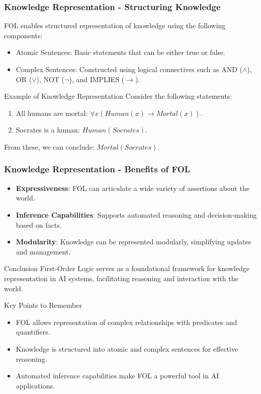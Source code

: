 \documentclass[aspectratio=169]{beamer}
\begin{document}
\begin{frame}[fragile]
    \frametitle{Knowledge Representation - Structuring Knowledge}
    FOL enables structured representation of knowledge using the following components:
    \begin{itemize}
        \item Atomic Sentences: Basic statements that can be either true or false.
        \item Complex Sentences: Constructed using logical connectives such as AND ($\land$), OR ($\lor$), NOT ($\neg$), and IMPLIES ($\to$).
    \end{itemize}

    \begin{block}{Example of Knowledge Representation}
        Consider the following statements:
        \begin{enumerate}
            \item All humans are mortal: $\forall x (Human(x) \rightarrow Mortal(x))$.
            \item Socrates is a human: $Human(Socrates)$.
        \end{enumerate}
        From these, we can conclude: $Mortal(Socrates)$.
    \end{block}
\end{frame}

\begin{frame}[fragile]
    \frametitle{Knowledge Representation - Benefits of FOL}
    \begin{itemize}
        \item \textbf{Expressiveness}: FOL can articulate a wide variety of assertions about the world.
        \item \textbf{Inference Capabilities}: Supports automated reasoning and decision-making based on facts.
        \item \textbf{Modularity}: Knowledge can be represented modularly, simplifying updates and management.
    \end{itemize}

    \begin{block}{Conclusion}
        First-Order Logic serves as a foundational framework for knowledge representation in AI systems, facilitating reasoning and interaction with the world.
    \end{block}
    
    \begin{block}{Key Points to Remember}
        \begin{itemize}
            \item FOL allows representation of complex relationships with predicates and quantifiers.
            \item Knowledge is structured into atomic and complex sentences for effective reasoning.
            \item Automated inference capabilities make FOL a powerful tool in AI applications.
        \end{itemize}
    \end{block}
\end{frame}
\end{document}
